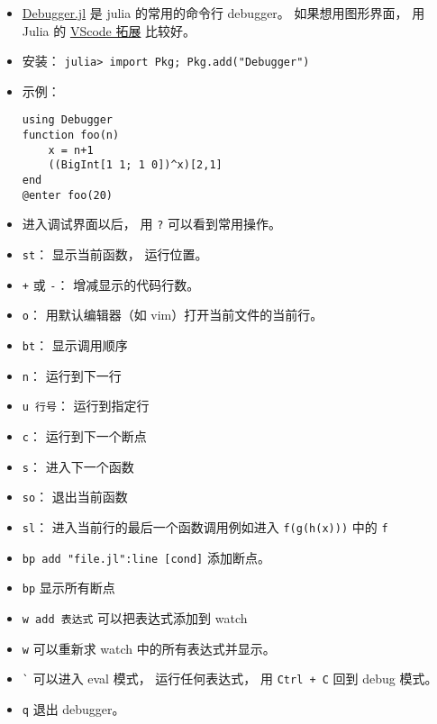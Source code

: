 
\begin{issues}
\issueDraft
\end{issues}

\begin{itemize}
\item \href{https://github.com/JuliaDebug/Debugger.jl}{Debugger.jl} 是 julia 的常用的命令行 debugger。 如果想用图形界面， 用 Julia 的 \href{https://www.julia-vscode.org}{VScode 拓展} 比较好。
\item 安装： \verb`julia> import Pkg; Pkg.add("Debugger")`
\item 示例：
\begin{lstlisting}[language=none]
using Debugger
function foo(n)
    x = n+1
    ((BigInt[1 1; 1 0])^x)[2,1]
end
@enter foo(20)
\end{lstlisting}
\item 进入调试界面以后， 用 \verb`?` 可以看到常用操作。
\item \verb`st`： 显示当前函数， 运行位置。
\item \verb`+` 或 \verb`-`： 增减显示的代码行数。
\item \verb`o`： 用默认编辑器（如 vim）打开当前文件的当前行。
\item \verb`bt`： 显示调用顺序
\item \verb`n`： 运行到下一行
\item \verb`u 行号`： 运行到指定行
\item \verb`c`： 运行到下一个断点
\item \verb`s`： 进入下一个函数
\item \verb`so`： 退出当前函数
\item \verb`sl`： 进入当前行的最后一个函数调用例如进入 \verb`f(g(h(x)))` 中的 \verb`f`
\item \verb`bp add "file.jl":line [cond]` 添加断点。
\item \verb`bp` 显示所有断点
\item \verb`w add 表达式` 可以把表达式添加到 watch
\item \verb`w` 可以重新求 watch 中的所有表达式并显示。
\item \verb|`| 可以进入 eval 模式， 运行任何表达式， 用 \verb`Ctrl + C` 回到 debug 模式。
\item \verb`q` 退出 debugger。
\end{itemize}
